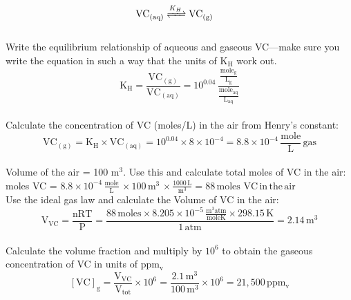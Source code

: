 \documentclass[12pt,letterpaper]{article}
\begin{document}
\begin{enumerate}
\begin{enumerate}
\begin{align*}
\cee{VC_{(aq)} &<=>[K_H] VC_{(g)}} 
\end{align*}\\

Write the equilibrium relationship of aqueous and gaseous VC---make sure you write the equation in such a way that the units of K$\mathrm{_H}$ work out.\\

\begin{equation*}
\mathrm{K_H = \frac{VC_{(g)}}{VC_{(aq)}} = 10^{0.04}\, \frac{\frac{mole_g}{L_g}}{\frac{mole_{aq}}{L_{aq}}}}
\end{equation*}\\

Calculate the concentration of VC (moles/L) in the air from Henry's constant:\\

\begin{equation*}
\mathrm{VC_{(g)} = K_H\times VC_{(aq)} = 10^{0.04}\times 8\times10^{-4} = 8.8\times 10^{-4}\, \frac{mole}{L}\, gas}
\end{equation*}\\

Volume of the air = 100 m$^3$.  Use this and calculate total moles of VC in the air:\\

moles VC = $\mathrm{8.8\times 10^{-4}\, \frac{mole}{L}\, \times 100\, m^3\, \times \frac{1000\, L}{m^3}= 88\, moles\,\, VC\, in\, the\, air}$\\

Use the ideal gas law and calculate the Volume of VC in the air:\\

\begin{equation*}
\mathrm{V_{VC} = \frac{nRT}{P} = \frac{88\, moles \times 8.205\times 10^{-5}\, \frac{m^3atm}{moleK}\times 298.15\, K}{1\, atm} = 2.14\, m^3}
\end{equation*}\\

Calculate the volume fraction and multiply by $10^6$ to obtain the gaseous concentration of VC in units of ppm$\mathrm{_v}$\\

\begin{equation*}
\mathrm{[VC]_g = \frac{V_{VC}}{V_{tot}}\times 10^6 = \frac{2.1\,m^3}{100\, m^3}\times 10^6 = 21,500 \, ppm_v}
\end{equation*}\\


\end{enumerate}
\end{enumerate}
\end{document}
